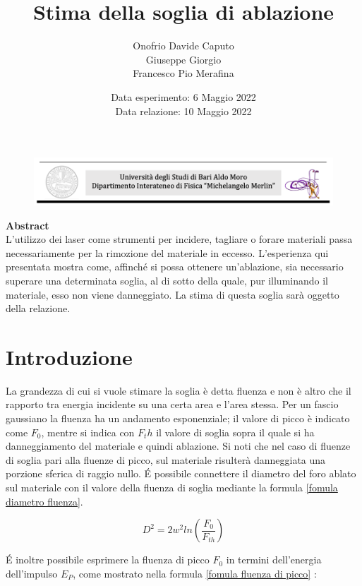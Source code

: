 \documentclass{article}
\title{\huge Stima della soglia di ablazione}
\author{ \large Onofrio Davide Caputo \\ \large Giuseppe Giorgio  \\ \large Francesco Pio Merafina}
\date{ \small Data esperimento: 6 Maggio 2022 \\ Data relazione: 10 Maggio 2022}
\begin{document}
\begin{figure}[t]
\hspace*{-2cm}
    \includegraphics{Uniba.png}
\end{figure} 
\maketitle

\noindent \textbf{\Large Abstract}\\

\noindent L'utilizzo dei laser come strumenti per incidere, tagliare o forare materiali passa necessariamente per la rimozione del materiale in eccesso. L'esperienza qui presentata mostra come, affinché si possa ottenere un'ablazione, sia necessario superare una determinata soglia, al di sotto della quale, pur illuminando il materiale, esso non viene danneggiato. 
La stima di questa soglia sarà oggetto della relazione. 

\tableofcontents

\normalsize
\setlength{\columnsep}{20pt}
\twocolumn
\section{Introduzione}
La grandezza di cui si vuole stimare la soglia è detta fluenza e non è altro che il rapporto tra energia incidente su una certa area e l'area stessa. 
Per un fascio gaussiano la fluenza ha un andamento esponenziale; il valore di picco è indicato come $F_0$, mentre si indica con $F_th$ il valore di soglia sopra il quale si ha danneggiamento del materiale e quindi ablazione.
Si noti che nel caso di fluenze di soglia pari alla fluenze di picco, sul materiale risulterà danneggiata una porzione sferica di raggio nullo.
É possibile connettere il diametro del foro ablato sul materiale con il valore della fluenza di soglia mediante la formula \ref{fomula diametro fluenza}.

\begin{equation}
    D^2 = 2w^2 ln (\frac{F_0}{F_{th}})
    \label{fomula diametro fluenza}
\end{equation}

É inoltre possibile esprimere la fluenza di picco $F_0$ in termini dell'energia dell'impulso $E_P$, come mostrato nella formula \ref{fomula fluenza di picco} :
\end{document}
